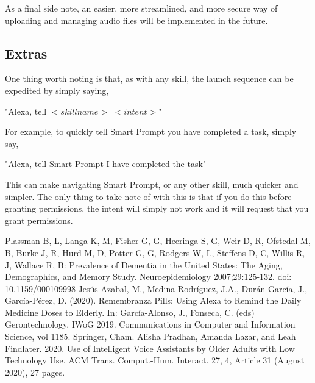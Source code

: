 \documentclass[11pt, oneside]{article}
\begin{document}
As a final side note, an easier, more streamlined, and more secure way of uploading and managing audio files will be implemented in the future.

\subsection{Extras}

One thing worth noting is that, as with any skill, the launch sequence can be expedited by simply saying,
\begin{center}
"Alexa, tell $<skill name>$ $<intent>$"
\end{center}
For example, to quickly tell Smart Prompt you have completed a task, simply say,
\begin{center}
"Alexa, tell Smart Prompt I have completed the task"
\end{center}
This can make navigating Smart Prompt, or any other skill, much quicker and simpler. The only thing to take note of with this is that if you do this before granting permissions, the intent will simply not work and it will request that you grant permissions.

\begin{thebibliography}{00}
 Plassman B, L, Langa K, M, Fisher G, G, Heeringa S, G, Weir D, R, Ofstedal M, B, Burke J, R, Hurd M, D, Potter G, G, Rodgers W, L, Steffens D, C, Willis R, J, Wallace R, B: Prevalence of Dementia in the United States: The Aging, Demographics, and Memory Study. Neuroepidemiology 2007;29:125-132. doi: 10.1159/000109998
 Jesús-Azabal, M., Medina-Rodríguez, J.A., Durán-García, J., García-Pérez, D. (2020). Remembranza Pills: Using Alexa to Remind the Daily Medicine Doses to Elderly. In: García-Alonso, J., Fonseca, C. (eds) Gerontechnology. IWoG 2019. Communications in Computer and Information Science, vol 1185. Springer, Cham. 
 Alisha Pradhan, Amanda Lazar, and Leah Findlater. 2020. Use of Intelligent Voice Assistants by Older Adults with Low Technology Use. ACM Trans. Comput.-Hum. Interact. 27, 4, Article 31 (August 2020), 27 pages.
\end{thebibliography}
\end{document}
